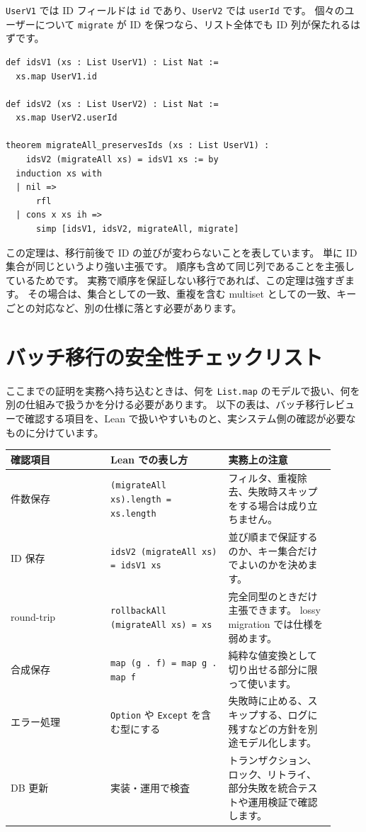 \texttt{UserV1} では ID フィールドは \texttt{id} であり、\texttt{UserV2} では \texttt{userId} です。
個々のユーザーについて \texttt{migrate} が ID を保つなら、リスト全体でも ID 列が保たれるはずです。

\begin{listing}[htbp]
\begin{verbatim}
def idsV1 (xs : List UserV1) : List Nat :=
  xs.map UserV1.id

def idsV2 (xs : List UserV2) : List Nat :=
  xs.map UserV2.userId

theorem migrateAll_preservesIds (xs : List UserV1) :
    idsV2 (migrateAll xs) = idsV1 xs := by
  induction xs with
  | nil =>
      rfl
  | cons x xs ih =>
      simp [idsV1, idsV2, migrateAll, migrate]
\end{verbatim}
\caption{\texttt{migrateAll\_preservesIds}}
\label{lst:ch30-id-preservation}
\end{listing}

この定理は、移行前後で ID の並びが変わらないことを表しています。
単に ID 集合が同じというより強い主張です。
順序も含めて同じ列であることを主張しているためです。
実務で順序を保証しない移行であれば、この定理は強すぎます。
その場合は、集合としての一致、重複を含む multiset としての一致、キーごとの対応など、別の仕様に落とす必要があります。

\section{バッチ移行の安全性チェックリスト}

ここまでの証明を実務へ持ち込むときは、何を \texttt{List.map} のモデルで扱い、何を別の仕組みで扱うかを分ける必要があります。
以下の表は、バッチ移行レビューで確認する項目を、Lean で扱いやすいものと、実システム側の確認が必要なものに分けています。

\begin{longtable}{p{0.28\linewidth}p{0.33\linewidth}p{0.30\linewidth}}
\toprule
確認項目 & Lean での表し方 & 実務上の注意 \\
\midrule
件数保存 & \texttt{(migrateAll xs).length = xs.length} & フィルタ、重複除去、失敗時スキップをする場合は成り立ちません。 \\
ID 保存 & \texttt{idsV2 (migrateAll xs) = idsV1 xs} & 並び順まで保証するのか、キー集合だけでよいのかを決めます。 \\
round-trip & \texttt{rollbackAll (migrateAll xs) = xs} & 完全同型のときだけ主張できます。
lossy migration では仕様を弱めます。 \\
合成保存 & \texttt{map (g . f) = map g . map f} & 純粋な値変換として切り出せる部分に限って使います。 \\
エラー処理 & \texttt{Option} や \texttt{Except} を含む型にする & 失敗時に止める、スキップする、ログに残すなどの方針を別途モデル化します。 \\
DB 更新 & 実装・運用で検査 & トランザクション、ロック、リトライ、部分失敗を統合テストや運用検証で確認します。 \\
\bottomrule
\end{longtable}

